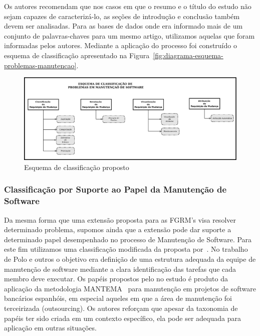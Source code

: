 Os autores recomendam que nos casos em que o resumo e o
título do estudo não sejam capazes de caracterizá-lo, as seções de introdução e
conclusão também devem ser analisadas. Para as bases de dados onde era informado mais de um conjunto
de palavras-chaves para um mesmo artigo, utilizamos aquelas que foram informadas pelos autores. Mediante a aplicação do processo foi
construído o esquema de classificação apresentado na Figura~\ref{fig:diagrama-esquema-problemas-manutencao}.

\begin{figure}[htpb]
	\centering
	\includegraphics[width=0.8\linewidth]{./chapter-mapeamento-sistematico/img/diagrama-esquema-problemas-manutencao.pdf}
	\caption{Esquema de classificação proposto}\label{fig:digrama-esquema-problemas-manutencao}
\end{figure}

\subsubsection{Classificação por Suporte ao Papel da Manutenção de Software}
\label{subsubsec:map-esquema-suporte-papel-man}

Da mesma forma que uma extensão proposta para as FGRM's visa resolver determinado
problema, supomos ainda que a extensão pode dar suporte a determinado papel desempenhado no processo
de Manutenção de Software. Para este fim utilizamos uma classificação modificada da proposta
por~\cite{Polo1999}. No trabalho de Polo e outros o objetivo era definição de uma estrutura adequada
da equipe de manutenção de software mediante a clara identificação das tarefas que cada membro deve
executar. Os papéis propostos pelo no estudo é produto da aplicação da metodologia MANTEMA~\cite{756695} para
manutenção em projetos de software bancários espanhóis, em especial aqueles em que a área de
manutenção foi terceirizada (outsourcing). Os autores reforçam que apesar da taxonomia de papéis ter
sido criada em um contexto específico, ela pode ser adequada para aplicação em outras situações.

